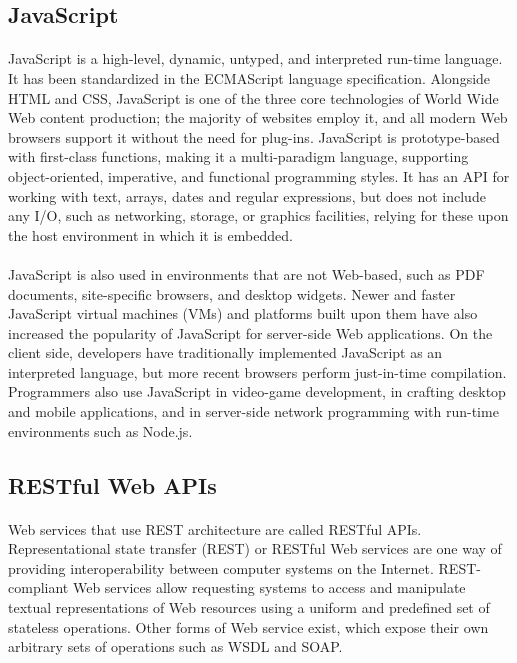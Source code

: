 \subsection{JavaScript}
\paragraph{}
JavaScript is a high-level, dynamic, untyped, and interpreted run-time language. It has been standardized in the ECMAScript language specification. Alongside HTML and CSS, JavaScript is one of the three core technologies of World Wide Web content production; the majority of websites employ it, and all modern Web browsers support it without the need for plug-ins. JavaScript is prototype-based with first-class functions, making it a multi-paradigm language, supporting object-oriented, imperative, and functional programming styles. It has an API for working with text, arrays, dates and regular expressions, but does not include any I/O, such as networking, storage, or graphics facilities, relying for these upon the host environment in which it is embedded.
\paragraph{}
JavaScript is also used in environments that are not Web-based, such as PDF documents, site-specific browsers, and desktop widgets. Newer and faster JavaScript virtual machines (VMs) and platforms built upon them have also increased the popularity of JavaScript for server-side Web applications. On the client side, developers have traditionally implemented JavaScript as an interpreted language, but more recent browsers perform just-in-time compilation. Programmers also use JavaScript in video-game development, in crafting desktop and mobile applications, and in server-side network programming with run-time environments such as Node.js.

\subsection{RESTful Web APIs}
\paragraph{}
Web services that use REST architecture are called RESTful APIs. Representational state transfer (REST) or RESTful Web services are one way of providing interoperability between computer systems on the Internet. REST-compliant Web services allow requesting systems to access and manipulate textual representations of Web resources using a uniform and predefined set of stateless operations. Other forms of Web service exist, which expose their own arbitrary sets of operations such as WSDL and SOAP.
